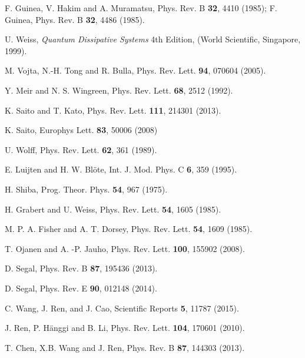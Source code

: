 \documentclass[12pt]{iopart}
\begin{document}
\begin{thebibliography}{99}
F. Guinea, V. Hakim and A. Muramatsu, Phys. Rev. B {\bf 32}, 4410 (1985);
F. Guinea, Phys. Rev. B {\bf 32}, 4486 (1985).

U. Weiss, {\em Quantum Dissipative Systems} 4th Edition, (World Scientific, Singapore, 1999).

 M. Vojta, N.-H. Tong and R. Bulla, Phys. Rev. Lett. \textbf{94}, 070604 (2005).

Y. Meir and N. S. Wingreen, Phys. Rev. Lett. {\bf 68}, 2512 (1992).

K. Saito and T. Kato, Phys. Rev. Lett. {\bf 111}, 214301 (2013).

K. Saito, Europhys Lett. \textbf{83}, 50006 (2008) 


U. Wolff, Phys. Rev. Lett. {\bf 62}, 361 (1989).

E. Luijten and H. W. Bl\"ote, Int. J. Mod. Phys. C \textbf {6}, 359 (1995).

H. Shiba, Prog. Theor. Phys. {\bf 54}, 967 (1975).

H. Grabert and U. Weiss, Phys. Rev. Lett. {\bf 54}, 1605 (1985).

M. P. A. Fisher and A. T. Dorsey, Phys. Rev. Lett. {\bf 54}, 1609 (1985).

T. Ojanen and A. -P. Jauho, Phys. Rev. Lett. {\bf 100}, 155902 (2008).

D. Segal, Phys. Rev. B {\bf 87}, 195436 (2013).

D. Segal, Phys. Rev. E {\bf 90}, 012148 (2014).

C. Wang, J. Ren, and J. Cao, Scientific Reports {\bf 5}, 11787 (2015).

J. Ren, P. H\"{a}nggi and B. Li, Phys. Rev. Lett. {\bf 104}, 170601 (2010).

 T. Chen, X.B. Wang and J. Ren, Phys. Rev. B {\bf 87}, 144303 (2013).

\end{thebibliography}
\end{document}
